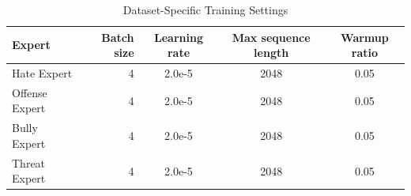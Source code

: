 
\begin{table}[htbp]
\centering
\caption{Dataset-Specific Training Settings}
\label{tab:dataset-specific-training-settings}
\small
\begin{tabular}{p{3.2cm} r c c c}
\toprule
Expert & Batch size & Learning rate & Max sequence length & Warmup ratio \\
\midrule
Hate Expert & 4 & 2.0e-5 & 2048 & 0.05 \\
Offense Expert & 4 & 2.0e-5 & 2048 & 0.05 \\
Bully Expert & 4 & 2.0e-5 & 2048 & 0.05 \\
Threat Expert & 4 & 2.0e-5 & 2048 & 0.05 \\
\bottomrule
\end{tabular}
\end{table}
